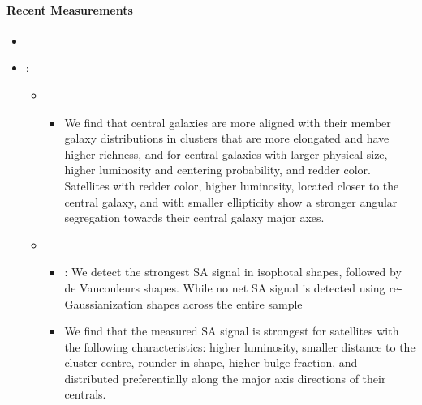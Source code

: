 \documentclass[letterpaper,10pt,english]{sphinxmanual}
\begin{document}
\paragraph{Recent Measurements}
\label{\detokenize{resource/astro/reference/wl_intrinsic_alignment:recent-measurements}}\begin{itemize}
\item {} 

\item {} 
:
\begin{itemize}
\item {} 
\begin{itemize}
\item {} 
We find that central galaxies are more aligned with their
member galaxy distributions in clusters that are more elongated
and have higher richness, and for central galaxies with larger
physical size, higher luminosity and centering probability, and
redder color. Satellites with redder color, higher luminosity,
located closer to the central galaxy, and with smaller
ellipticity show a stronger angular segregation towards their
central galaxy major axes.

\end{itemize}

\item {} 
\begin{itemize}
\item {} 
: We detect the strongest SA
signal in isophotal shapes, followed by de Vaucouleurs shapes.
While no net SA signal is detected using re-Gaussianization
shapes across the entire sample

\item {} 
We find that the measured SA signal is strongest for satellites
with the following characteristics: higher luminosity, smaller
distance to the cluster centre, rounder in shape, higher bulge
fraction, and distributed preferentially along the major axis
directions of their centrals.


\end{itemize}
\end{itemize}
\end{itemize}
\end{document}
